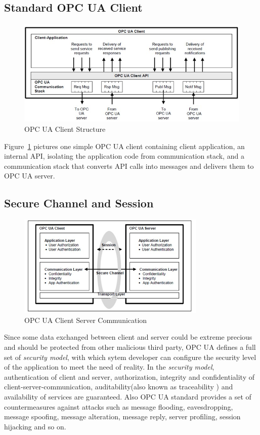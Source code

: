 \subsection{Standard OPC UA Client}
\begin{figure}[!htbp]
	\centering
	\includegraphics[width=1.0\textwidth]{client.jpg}
		\caption{OPC UA Client Structure\cite{O1}}
	\label{fig:client}
\end{figure}

Figure~\ref{fig:client} pictures one simple OPC UA client containing client application, an internal API, isolating the application code from communication stack, and a communication stack that converts API calls into messages and delivers them to OPC UA server.

\subsection{Secure Channel and Session}

\begin{figure}[!htbp]
	\centering
	\includegraphics[width=0.8\textwidth]{opc_ua_cs_comm.jpg}
		\caption{OPC UA Client Server Communication\cite{O2}}
	\label{fig:opc_ua_cs_comm}
\end{figure}

Since some data exchanged between client and server could be extreme precious and should be protected from other malicious third party, OPC UA defines a full set of  \emph{security model}, with which sytem developer can configure the security level of the application to meet the need of reality. In the \emph{security model}, authentication of client and server, authorization, integrity and confidentiality of client-server-communication, auditability(also known as traceability ) and availability of services are guaranteed. Also OPC UA  standard provides a set of countermeasures against attacks such as message flooding, eavesdropping, message spoofing, message alteration, message reply, server profiling, session hijacking and so on\cite{O2}.


